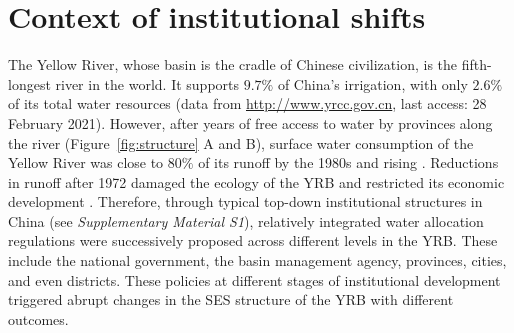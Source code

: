 \documentclass{article}
\begin{document}
\section{Context of institutional shifts}
The Yellow River, whose basin is the cradle of Chinese civilization, is the fifth-longest river in the world. It supports $9.7\%$ of China’s irrigation, with only $2.6\%$ of its total water resources (data from \href{http://www.yrcc.gov.cn}{http://www.yrcc.gov.cn}, last access: 28 February 2021).
However, after years of free access to water by provinces along the river (Figure~\ref{fig:structure} A and B), surface water consumption of the Yellow River was close to $80\%$ of its runoff by the 1980s and rising
\cite{wangYellowRiverwater2019,songSedimenttransportincreasing2020}.
Reductions in runoff after 1972 damaged the ecology of the YRB and restricted its economic development \cite{wangYellowRiverwater2019}.
Therefore, through typical top-down institutional structures in China (see \textit{Supplementary Material S1}), relatively integrated water allocation regulations were successively proposed across different levels in the YRB.
These include the national government, the basin management agency, provinces, cities, and even districts.
These policies at different stages of institutional development triggered abrupt changes in the SES structure of the YRB with different outcomes.
\end{document}

